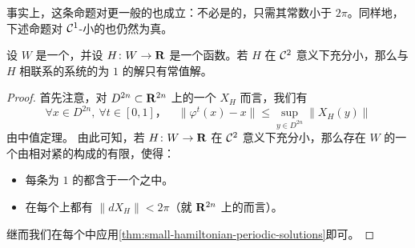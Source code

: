 事实上，这条命题对更一般的\trVectorField{}也成立：不必是\trHamiltonian{}的，只需其\trLipschitz{}常数小于 $2\pi$。同样地，下述命题对 $\mathcal{C}^1$-小的\trVectorField{}也仍然为真。

\begin{proposition}\label{thm:small-hamiltonian-constant-solutions}
设 $W$ 是一个\trCompact\trSymplectic\trManifold，并设 $H\colon W\to\mathbf{R}$ 是一个函数。若 $H$ 在 $\mathcal{C}^2$ 意义下充分小，那么与 $H$ 相联系的\trHamiltonian{}系统的\trPeriodic{}为 $1$ 的解只有常值解。
\end{proposition}

\begin{proof}
首先注意，对\trDisk{} $D^{2n}\subset\mathbf{R}^{2n}$ 上的一个\trHamiltonian\trVectorField{} $X_H$ 而言，我们有
\[
\forall x\in D^{2n},\ \forall t\in[0,1]\text{，}\quad \bigl\|\varphi^t(x)-x\bigr\|\le\sup_{y\in D^{2n}}\|X_H(y)\|
\]
由中值定理。
由此可知，若 $H\colon W\to\mathbf{R}$ 在 $\mathcal{C}^2$ 意义下充分小，那么存在\trCompact\trManifold{} $W$ 的一个由相对紧的\trDarboux\trChart{}构成的有限\trCovering，使得：
\begin{itemize}
\item 每条\trPeriodic{}为 $1$ 的\trTrajectory{}都含于一个\trChart{}之中。
\item 在每个\trChart{}上都有 $\|dX_H\|<2\pi$（就 $\mathbf{R}^{2n}$ 上的\trMetric{}而言）。
\end{itemize}
继而我们在每个\trChart{}中应用\cref{thm:small-hamiltonian-periodic-solutions}即可。
\end{proof}
